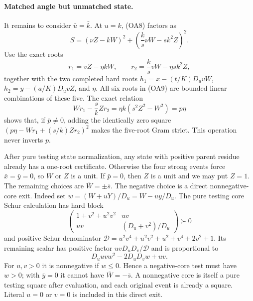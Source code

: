 \paragraph{Matched angle but unmatched state.}
It remains to consider $\bar u=\bar k$. At $u=k$, (OA8) factors as
\[
 S=(\nu Z-kW)^2+
       \left(\frac{k}{s}\nu W-sk^2Z\right)^2.          \tag{OA12}
\]
Use the exact roots
\[
 r_1=vZ-\eta kW,\qquad
 r_2=\frac{k}{s}vW-\eta sk^2Z,
\]
together with the two completed hard roots
$h_1=x-(t/K)D_uvW$, $h_2=y-(a/K)D_uvZ$, and $\eta$.
All six roots in (OA9) are bounded linear combinations of these five.
The exact relation
\[
 Wr_1-\frac{s}{k}Zr_2
   =\eta k(s^2Z^2-W^2)=p\eta                         \tag{OA13}
\]
shows that, if $\bar p\ne0$, adding the identically zero square
$(p\eta-Wr_1+(s/k)Zr_2)^2$ makes the five-root Gram strict.
This operation never inverts $p$.

After pure testing state normalization, any state with positive
parent residue already has a one-root certificate. Otherwise the
four strong events force $\bar x=\bar y=0$, so $W$ or $Z$ is a unit.
If $\bar p=0$, then $Z$ is a unit and we may put $Z=1$.
The remaining choices are $\bar W=\pm\bar s$. The negative choice
is a direct nonnegative-core exit. Indeed set
$w=(W+uY)/D_u=W-uy/D_u$. The pure testing core Schur calculation has hard block
\[
 \begin{pmatrix}1+v^2+u^2v^2&uv\\uv&(D_u+v^2)/D_u\end{pmatrix}\succ0
\]
and positive Schur denominator
$\mathcal D=u^2v^4+u^2v^2+u^2+v^4+2v^2+1$.
Its remaining scalar has positive factor $uvD_uD_v/\mathcal D$
and is proportional to
\[
 D_uuv w^2-2D_uD_vw+uv.
\]
For $u,v>0$ it is nonnegative if $w\leq0$. Hence a negative-core
test must have $w>0$; with $\bar y=0$ it cannot have
$\bar W=-\bar s$. A nonnegative core is itself a pure testing
square after evaluation, and each original event is already a square.
Literal $u=0$ or $v=0$ is included in this direct exit.

